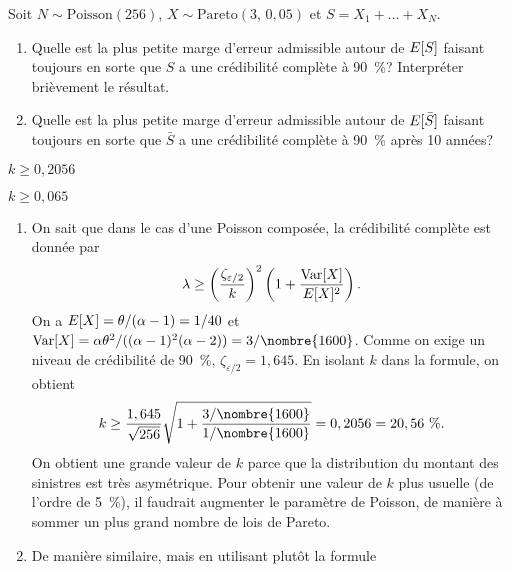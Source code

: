 \begin{exercice}
  Soit $N \sim \text{Poisson}(256)$, $X \sim \text{Pareto}(3,\, 0,05)$
  et $S = X_1 + \dots + X_N$.
  \begin{enumerate}
  \item Quelle est la plus petite marge d'erreur admissible autour de
    $E [ S ]$ faisant toujours en sorte que $S$ a une crédibilité
    complète à 90~\%?  Interpréter brièvement le résultat.
  \item Quelle est la plus petite marge d'erreur admissible autour de
    $E [ \bar{S} ]$ faisant toujours en sorte que $\bar{S}$ a une
    crédibilité complète à 90~\% après 10 années?
  \end{enumerate}
  \begin{rep}
    \begin{inparaenum}
    \item $k \geq 0,2056$
    \item $k \geq 0,065$
    \end{inparaenum}
  \end{rep}
  \begin{sol}
    \begin{enumerate}
    \item On sait que dans le cas d'une Poisson composée, la
      crédibilité complète est donnée par
      \begin{displaymath}
        \lambda \geq
        \left(
          \frac{\zeta_{\varepsilon/2}}{k}
        \right)^2
        \left(
          1 + \frac{\operatorname{Var} [ X ]}{E [ X ]^2}
        \right).
      \end{displaymath}
      On a $E [ X ] = \theta/(\alpha - 1) = 1/40$ et $\var{X} = \alpha
      \theta^2/((\alpha - 1)^2(\alpha - 2)) = 3/\nombre{1600}$. Comme
      on exige un niveau de crédibilité de 90~\%,
      $\zeta_{\varepsilon/2} = 1,645$.  En isolant $k$ dans la
      formule, on obtient
      \begin{displaymath}
        k \ge
        \frac{1,645}{\sqrt{256}}
        \sqrt{1 + \frac{3/\nombre{1600}}{1/\nombre{1600}}} = 0,2056 = 20,56~\%.
      \end{displaymath}
      On obtient une grande valeur de $k$ parce que la distribution du
      montant des sinistres est très asymétrique. Pour obtenir une
      valeur de $k$ plus usuelle (de l'ordre de 5~\%), il faudrait
      augmenter le paramètre de Poisson, de manière à sommer un plus
      grand nombre de lois de Pareto.
    \item De manière similaire, mais en utilisant plutôt la formule

\end{enumerate}
\end{sol}
\end{exercice}
